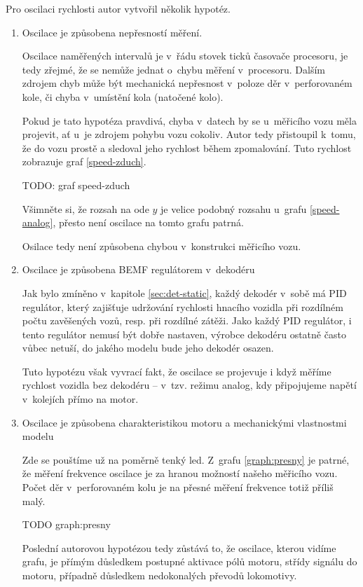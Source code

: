 Pro oscilaci rychlosti autor vytvořil několik hypotéz.

\begin{enumerate}
\item Oscilace je způsobena nepřesností měření.

Oscilace naměřených intervalů je v~řádu stovek ticků časovače procesoru, je tedy
zřejmé, že se nemůže jednat o~chybu měření v~procesoru. Dalším zdrojem chyb
může být mechanická nepřesnost v~poloze děr v~perforovaném kole, či chyba
v~umístění kola (natočené kolo).

Pokud je tato hypotéza pravdivá, chyba v~datech by se u~měřicího vozu měla
projevit, ať u~je zdrojem pohybu vozu cokoliv. Autor tedy přistoupil k~tomu,
že do vozu prostě  a sledoval jeho rychlost během zpomalování.
Tuto rychlost zobrazuje graf \ref{speed-zduch}.

TODO: graf speed-zduch

Všimněte si, že rozsah na ode $y$ je velice podobný rozsahu u~grafu
\ref{speed-analog}, přesto není oscilace na tomto grafu patrná.

Osilace tedy není způsobena chybou v~konstrukci měřicího vozu.

\item Oscilace je způsobena BEMF regulátorem v~dekodéru

Jak bylo zmíněno v~kapitole \ref{sec:det-static}, každý dekodér v~sobě má PID
regulátor, který zajišťuje udržování rychlosti hnacího vozidla při rozdílném
počtu zavěšených vozů, resp. při rozdílné zátěži. Jako každý PID regulátor,
i tento regulátor nemusí být dobře nastaven, výrobce dekodéru ostatně často
vůbec netuší, do jakého modelu bude jeho dekodér osazen.

Tuto hypotézu však vyvrací fakt, že oscilace se projevuje i když měříme rychlost
vozidla bez dekodéru -- v~tzv. režimu analog, kdy připojujeme napětí v~kolejích
přímo na motor.

\item Oscilace je způsobena charakteristikou motoru a mechanickými vlastnostmi
modelu

Zde se pouštíme už na poměrně tenký led. Z~grafu \ref{graph:presny} je patrné,
že měření frekvence oscilace je za hranou možností našeho měřicího vozu. Počet
děr v~perforovaném kolu je na přesné měření frekvence totiž příliš malý.

TODO graph:presny

Poslední autorovou hypotézou tedy zůstává to, že oscilace, kterou vidíme grafu,
je přímým důsledkem postupné aktivace pólů motoru, střídy signálu do motoru,
případně důsledkem nedokonalých převodů lokomotivy.


\end{enumerate}
